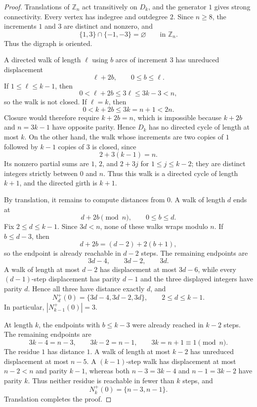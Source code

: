 \documentclass[11pt]{amsart}
\theoremstyle{remark}
\newcommand{\Z}{\mathbb{Z}}
\begin{document}
\begin{proof}
Translations of $\Z_n$ act transitively on $D_k$, and the generator $1$
gives strong connectivity. Every vertex has indegree and outdegree $2$.
Since $n\ge8$, the increments $1$ and $3$ are distinct and nonzero, and
\[
  \{1,3\}\cap\{-1,-3\}=\varnothing
  \qquad\text{in }\Z_n.
\]
Thus the digraph is oriented.

A directed walk of length $\ell$ using $b$ arcs of increment $3$ has
unreduced displacement
\[
  \ell+2b,
  \qquad 0\le b\le\ell.
\]
If $1\le\ell\le k-1$, then
\[
  0<\ell+2b\le3\ell\le3k-3<n,
\]
so the walk is not closed. If $\ell=k$, then
\[
  0<k+2b\le3k=n+1<2n.
\]
Closure would therefore require $k+2b=n$, which is impossible because
$k+2b$ and $n=3k-1$ have opposite parity. Hence $D_k$ has no directed cycle
of length at most $k$. On the other hand, the walk whose increments are two
copies of $1$ followed by $k-1$ copies of $3$ is closed, since
\[
  2+3(k-1)=n.
\]
Its nonzero partial sums are $1$, $2$, and $2+3j$ for
$1\le j\le k-2$; they are distinct integers strictly between $0$ and $n$.
Thus this walk is a directed cycle of length $k+1$, and the directed girth
is $k+1$.

By translation, it remains to compute distances from $0$. A walk of length
$d$ ends at
\[
  d+2b\pmod n,
  \qquad 0\le b\le d.
\]
Fix $2\le d\le k-1$. Since $3d<n$, none of these walks wraps modulo $n$.
If $b\le d-3$, then
\[
  d+2b=(d-2)+2(b+1),
\]
so the endpoint is already reachable in $d-2$ steps. The remaining
endpoints are
\[
  3d-4,\qquad 3d-2,\qquad 3d.
\]
A walk of length at most $d-2$ has displacement at most $3d-6$, while every
$(d-1)$-step displacement has parity $d-1$ and the three displayed
integers have parity $d$. Hence all three have distance exactly $d$, and
\[
  N_d^+(0)=\{3d-4,3d-2,3d\},
  \qquad 2\le d\le k-1.
\]
In particular, $|N_{k-1}^+(0)|=3$.

At length $k$, the endpoints with $b\le k-3$ were already reached in
$k-2$ steps. The remaining endpoints are
\[
  3k-4=n-3,\qquad 3k-2=n-1,\qquad 3k=n+1\equiv1\pmod n.
\]
The residue $1$ has distance $1$. A walk of length at most $k-2$ has
unreduced displacement at most $n-5$. A $(k-1)$-step walk has displacement
at most $n-2<n$ and parity $k-1$, whereas both $n-3=3k-4$ and $n-1=3k-2$
have parity $k$. Thus neither residue is reachable in fewer than $k$ steps,
and
\[
  N_k^+(0)=\{n-3,n-1\}.
\]
Translation completes the proof.
\end{proof}
\end{document}
